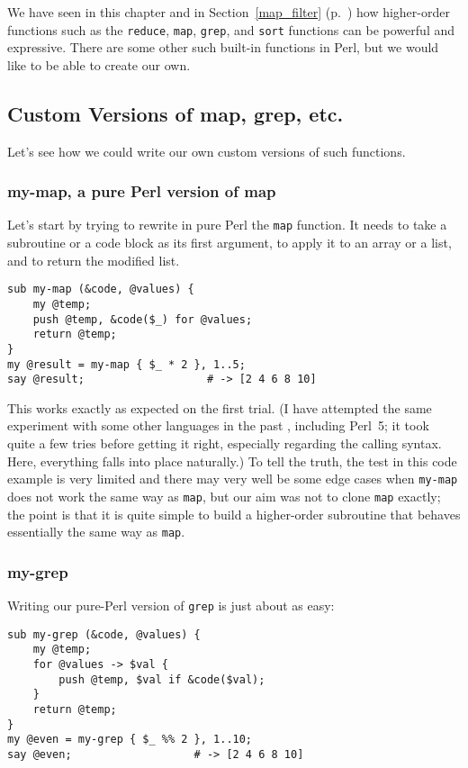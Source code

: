 We have seen in this chapter and in 
Section~\ref{map_filter} (p.~\pageref{map_filter}) 
how higher-order functions such as the {\tt reduce}, 
{\tt map}, {\tt grep}, and {\tt sort} functions 
can be powerful and expressive. There are some 
other such built-in functions in Perl, but we would 
like to be able to create our own.

\subsection{Custom Versions of map, grep, etc.}

Let's see how we could write our own custom versions 
of such functions.

\subsubsection{my-map, a pure Perl version of map}

Let's start by trying to rewrite in pure Perl the 
{\tt map} function. It needs to take a subroutine 
or a code block as its first argument, to apply it 
to an array or a list, and to return the modified 
list.

\begin{verbatim}
sub my-map (&code, @values) { 
    my @temp;
    push @temp, &code($_) for @values;
    return @temp;
}
my @result = my-map { $_ * 2 }, 1..5; 
say @result;                   # -> [2 4 6 8 10]
\end{verbatim}

This works exactly as expected on the first trial. 
(I have attempted the same experiment with some other 
languages in the past , including Perl~5; it took quite 
a few tries before getting it right, especially 
regarding the calling syntax. Here, everything 
falls into place naturally.) To tell the truth, 
the test in this code example is very limited and 
there may very well be some edge cases when 
{\tt my-map} does not work the same way as {\tt map}, 
but our aim was not to clone {\tt map} exactly; 
the point is that it is quite simple to build a 
higher-order subroutine that behaves essentially the 
same way as {\tt map}. 

\subsubsection{my-grep}

Writing our pure-Perl version of {\tt grep} is just about as 
easy:
\begin{verbatim}
sub my-grep (&code, @values) { 
    my @temp;
    for @values -> $val {
        push @temp, $val if &code($val);
    }
    return @temp;
}
my @even = my-grep { $_ %% 2 }, 1..10; 
say @even;                   # -> [2 4 6 8 10]
\end{verbatim}

